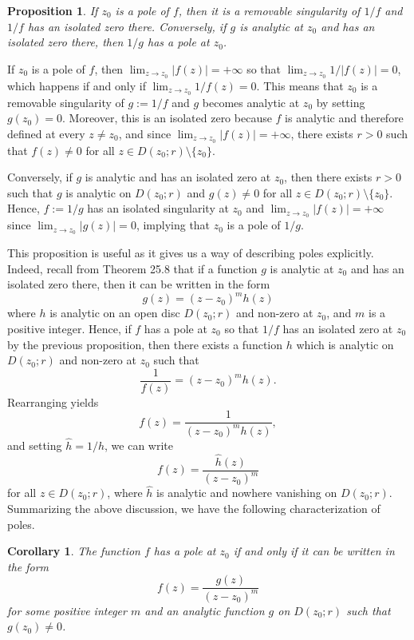 \documentclass[10pt]{article}
\makeatletter
\theoremstyle{newstyle}
\newtheorem{cor}[thm]{Corollary}
\newtheorem{prop}[thm]{Proposition}
\newenvironment{pf}[1][\proofname]{\par
  \pushQED{\qed}%
  \normalfont \topsep0\p@\relax
  \trivlist
  \item[\hskip\labelsep\scshape
  #1\@addpunct{.}]\ignorespaces
}{%
  \popQED\endtrivlist\@endpefalse
}
\makeatother
\begin{document}
\begin{prop}
If $z_0$ is a pole of $f$, then it is a removable singularity of $1/f$ and $1/f$ has an isolated 
zero there. Conversely, if $g$ is analytic at $z_0$ and has an isolated zero there, then 
$1/g$ has a pole at $z_0$. 
\end{prop}
\begin{pf}
If $z_0$ is a pole of $f$, then $\lim_{z\to z_0} |f(z)| = +\infty$ so that 
$\lim_{z\to z_0} 1/|f(z)| = 0$, which happens if and only if $\lim_{z\to z_0} 1/f(z) = 0$. 
This means that $z_0$ is a removable singularity of $g := 1/f$ and $g$ becomes analytic 
at $z_0$ by setting $g(z_0) = 0$. Moreover, this is an isolated zero because $f$ is analytic 
and therefore defined at every $z \neq z_0$, and since $\lim_{z\to z_0} |f(z)| = +\infty$, 
there exists $r > 0$ such that $f(z) \neq 0$ for all $z \in D(z_0; r) \setminus \{z_0\}$.

Conversely, if $g$ is analytic and has an isolated zero at $z_0$, then there exists $r > 0$ 
such that $g$ is analytic on $D(z_0; r)$ and $g(z) \neq 0$ for all $z \in D(z_0; r) \setminus \{z_0\}$. 
Hence, $f := 1/g$ has an isolated singularity at $z_0$ and $\lim_{z\to z_0} |f(z)| = +\infty$ 
since $\lim_{z\to z_0} |g(z)| = 0$, implying that $z_0$ is a pole of $1/g$. 
\end{pf}

This proposition is useful as it gives us a way of describing poles explicitly. Indeed, recall 
from Theorem 25.8 that 
if a function $g$ is analytic at $z_0$ and has an isolated zero there, then it can be written 
in the form 
\[ g(z) = (z-z_0)^m h(z) \]
where $h$ is analytic on an open disc $D(z_0; r)$ and non-zero at $z_0$, and 
$m$ is a positive integer. Hence, if $f$ has a pole at $z_0$ so that $1/f$ has an isolated 
zero at $z_0$ by the previous proposition, then there exists a function $h$ which is 
analytic on $D(z_0; r)$ and non-zero at $z_0$ such that 
\[ \frac{1}{f(z)} = (z-z_0)^m h(z). \]
Rearranging yields 
\[ f(z) = \frac{1}{(z-z_0)^m h(z)}, \]
and setting $\hat h = 1/h$, we can write 
\[ f(z) = \frac{\hat h(z)}{(z-z_0)^m} \]
for all $z \in D(z_0; r)$, where $\hat h$ is analytic and nowhere vanishing on $D(z_0; r)$. 
Summarizing the above discussion, we have the following characterization of poles. 

\begin{cor}
The function $f$ has a pole at $z_0$ if and only if it can be written in the form 
\[ f(z) = \frac{g(z)}{(z-z_0)^m} \tag{$\star$} \]
for some positive integer $m$ and an analytic function $g$ on $D(z_0; r)$ such that $g(z_0) \neq 0$. 
\end{cor}
\end{document}
